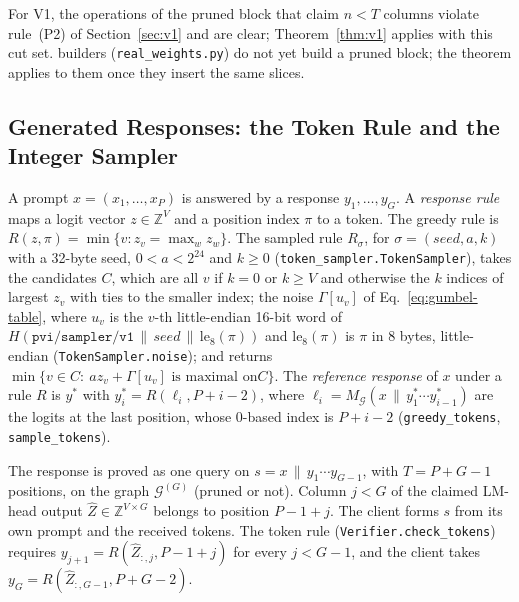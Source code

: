 \noindent For V1, the operations of the pruned block that claim $n<T$ columns violate rule~(P2) of
Section~\ref{sec:v1} and are clear; Theorem~\ref{thm:v1} applies with this cut set.
builders (\texttt{real\_weights.py}) do not yet build a pruned block; the theorem applies to them
once they insert the same slices.

\subsection{Generated Responses: the Token Rule and the Integer Sampler}
\label{app:gen}

 A prompt $x=(x_1,\dots,x_P)$ is answered by a response
$y_1,\dots,y_G$. A \emph{response rule} maps a logit vector $z\in\mathbb Z^V$ and a position index
$\pi$ to a token. The greedy rule is $R(z,\pi)=\min\{v:z_v=\max_wz_w\}$. The sampled rule
$R_\sigma$, for $\sigma=(\mathit{seed},a,k)$ with a 32-byte seed, $0<a<2^{24}$ and $k\ge0$
(\texttt{token\_sampler.TokenSampler}), takes the candidates $C$, which are all $v$ if $k=0$ or
$k\ge V$ and otherwise the $k$ indices of largest $z_v$ with ties to the smaller index; the noise
$\Gamma[u_v]$ of Eq.~\eqref{eq:gumbel-table}, where $u_v$ is the $v$-th little-endian 16-bit word of
$H(\texttt{pvi/sampler/v1}\,\|\,\mathit{seed}\,\|\,\mathrm{le}_8(\pi))$ and $\mathrm{le}_8(\pi)$ is
$\pi$ in 8 bytes, little-endian (\texttt{TokenSampler.noise}); and returns $\min\{v\in C:\ az_v+\Gamma[u_v]\text{ is maximal on
}C\}$. The \emph{reference response} of $x$ under a rule $R$ is $y^\ast$ with
$y^\ast_i=R(\ell_i,P+i-2)$, where $\ell_i=M_{\mathcal G}(x\,\|\,y^\ast_1\cdots y^\ast_{i-1})$ are the
logits at the last position, whose 0-based index is $P+i-2$ (\texttt{greedy\_tokens},
\texttt{sample\_tokens}).

 The response is proved as one query on $s=x\,\|\,y_1\cdots y_{G-1}$, with
$T=P+G-1$ positions, on the graph $\mathcal G^{(G)}$ (pruned or not). Column $j<G$ of the claimed
LM-head output $\hat Z\in\mathbb Z^{V\times G}$ belongs to position $P-1+j$. The client forms $s$
from its own prompt and the received tokens. The token rule (\texttt{Verifier.check\_tokens})
requires $y_{j+1}=R(\hat Z_{:,j},P-1+j)$ for every $j<G-1$, and the client takes
$y_G=R(\hat Z_{:,G-1},P+G-2)$.

